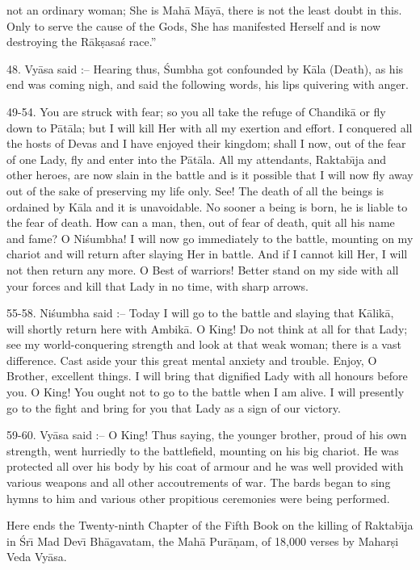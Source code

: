not an ordinary woman; She is Mah\=a M\=ay\=a, there is not the least doubt in this. Only to serve the cause of the Gods, She has manifested Herself and is now destroying the R\=ak\d{s}asa\'s race.''

48. Vy\=asa said :-- Hearing thus, \'Sumbha got confounded by K\=ala (Death), as his end was coming nigh, and said the following words, his lips quivering with anger.

49-54. You are struck with fear; so you all take the refuge of Chandik\=a or fly down to P\=at\=ala; but I will kill Her with all my exertion and effort. I conquered all the hosts of Devas and I have enjoyed their kingdom; shall I now, out of the fear of one Lady, fly and enter into the P\=at\=ala. All my attendants, Raktab\={\i}ja and other heroes, are now slain in the battle and is it possible that I will now fly away out of the sake of preserving my life only. See! The death of all the beings is ordained by K\=ala and it is unavoidable. No sooner a being is born, he is liable to the fear of death. How can a man, then, out of fear of death, quit all his name and fame? O Ni\'sumbha! I will now go immediately to the battle, mounting on my chariot and will return after slaying Her in battle. And if I cannot kill Her, I will not then return any more. O Best of warriors! Better stand on my side with all your forces and kill that Lady in no time, with sharp arrows.

55-58. Ni\'sumbha said :-- Today I will go to the battle and slaying that K\=alik\=a, will shortly return here with Ambik\=a. O King! Do not think at all for that Lady; see my world-conquering strength and look at that weak woman; there is a vast difference. Cast aside your this great mental anxiety and trouble. Enjoy, O Brother, excellent things. I will bring that dignified Lady with all honours before you. O King! You ought not to go to the battle when I am alive. I will presently go to the fight and bring for you that Lady as a sign of our victory.

59-60. Vy\=asa said :-- O King! Thus saying, the younger brother, proud of his own strength, went hurriedly to the battlefield, mounting on his big chariot. He was protected all over his body by his coat of armour and he was well provided with various weapons and all other accoutrements of war. The bards began to sing hymns to him and various other propitious ceremonies were being performed.

Here ends the Twenty-ninth Chapter of the Fifth Book on the killing of Raktab\={\i}ja in \'Sr\={\i} Mad Dev\={\i} Bh\=agavatam, the Mah\=a Pur\=a\d{n}am, of 18,000 verses by Mahar\d{s}i Veda Vy\=asa.



